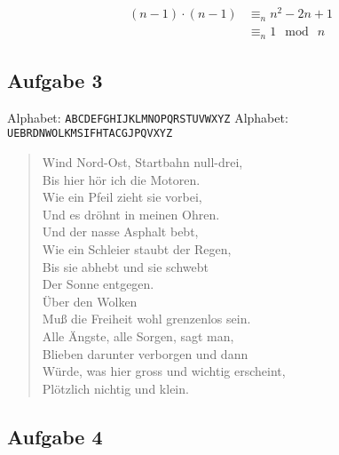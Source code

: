 \begin{align}
	(n-1) \cdot (n-1) & \equiv_n n^2 -2n + 1 \\
					  & \equiv_n 1 \mod ~ n
\end{align}



\subsection{Aufgabe 3}

Alphabet: \verb+ABCDEFGHIJKLMNOPQRSTUVWXYZ+
Alphabet: \verb+UEBRDNWOLKMSIFHTACGJPQVXYZ+

\begin{verse}
Wind Nord-Ost, Startbahn null-drei,\\
Bis hier hör ich die Motoren.\\
Wie ein Pfeil zieht sie vorbei,\\
Und es dröhnt in meinen Ohren.\\
Und der nasse Asphalt bebt,\\
Wie ein Schleier staubt der Regen,\\
Bis sie abhebt und sie schwebt\\
Der Sonne entgegen.\\
Über den Wolken\\
Muß die Freiheit wohl grenzenlos sein.\\
Alle Ängste, alle Sorgen, sagt man,\\
Blieben darunter verborgen und dann\\
Würde, was hier gross und wichtig erscheint,\\
Plötzlich nichtig und klein.\\
\end{verse}




\subsection{Aufgabe 4}

